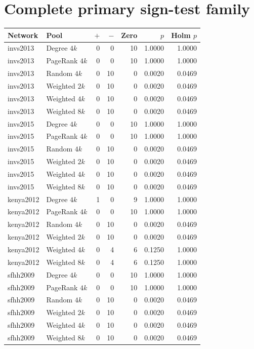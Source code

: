 \documentclass[11pt]{article}
\begin{document}
\section{Complete primary sign-test family}
\begin{longtable}{llrrrrr}
\toprule Network & Pool & $+$ & $-$ & Zero & $p$ & Holm $p$ \\ \midrule\endhead
invs2013 & Degree $4k$ & 0 & 0 & 10 & 1.0000 & 1.0000 \\
invs2013 & PageRank $4k$ & 0 & 0 & 10 & 1.0000 & 1.0000 \\
invs2013 & Random $4k$ & 0 & 10 & 0 & 0.0020 & 0.0469 \\
invs2013 & Weighted $2k$ & 0 & 10 & 0 & 0.0020 & 0.0469 \\
invs2013 & Weighted $4k$ & 0 & 10 & 0 & 0.0020 & 0.0469 \\
invs2013 & Weighted $8k$ & 0 & 10 & 0 & 0.0020 & 0.0469 \\
invs2015 & Degree $4k$ & 0 & 0 & 10 & 1.0000 & 1.0000 \\
invs2015 & PageRank $4k$ & 0 & 0 & 10 & 1.0000 & 1.0000 \\
invs2015 & Random $4k$ & 0 & 10 & 0 & 0.0020 & 0.0469 \\
invs2015 & Weighted $2k$ & 0 & 10 & 0 & 0.0020 & 0.0469 \\
invs2015 & Weighted $4k$ & 0 & 10 & 0 & 0.0020 & 0.0469 \\
invs2015 & Weighted $8k$ & 0 & 10 & 0 & 0.0020 & 0.0469 \\
kenya2012 & Degree $4k$ & 1 & 0 & 9 & 1.0000 & 1.0000 \\
kenya2012 & PageRank $4k$ & 0 & 0 & 10 & 1.0000 & 1.0000 \\
kenya2012 & Random $4k$ & 0 & 10 & 0 & 0.0020 & 0.0469 \\
kenya2012 & Weighted $2k$ & 0 & 10 & 0 & 0.0020 & 0.0469 \\
kenya2012 & Weighted $4k$ & 0 & 4 & 6 & 0.1250 & 1.0000 \\
kenya2012 & Weighted $8k$ & 0 & 4 & 6 & 0.1250 & 1.0000 \\
sfhh2009 & Degree $4k$ & 0 & 0 & 10 & 1.0000 & 1.0000 \\
sfhh2009 & PageRank $4k$ & 0 & 0 & 10 & 1.0000 & 1.0000 \\
sfhh2009 & Random $4k$ & 0 & 10 & 0 & 0.0020 & 0.0469 \\
sfhh2009 & Weighted $2k$ & 0 & 10 & 0 & 0.0020 & 0.0469 \\
sfhh2009 & Weighted $4k$ & 0 & 10 & 0 & 0.0020 & 0.0469 \\
sfhh2009 & Weighted $8k$ & 0 & 10 & 0 & 0.0020 & 0.0469 \\
\bottomrule\end{longtable}
\end{document}
